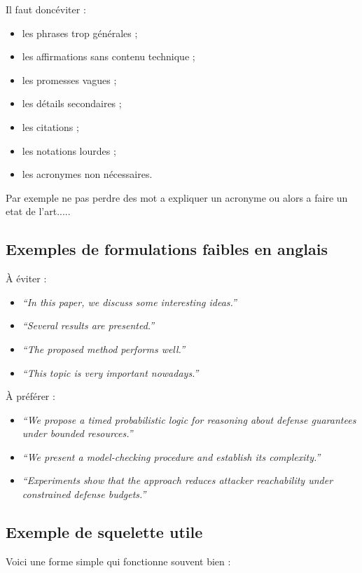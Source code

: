 \documentclass[11pt,a4paper]{article}
\theoremstyle{definition}
\begin{document}
Il faut doncéviter :
\begin{itemize}
    \item les phrases trop générales ;
    \item les affirmations sans contenu technique ;
    \item les promesses vagues ;
    \item les détails secondaires ;
    \item les citations ;
    \item les notations lourdes ;
    \item les acronymes non nécessaires.
\end{itemize}
Par exemple ne pas perdre des mot a expliquer un acronyme ou alors a faire un etat de l'art.....

\subsection*{Exemples de formulations faibles en anglais}

À éviter :
\begin{itemize}
    \item \textit{``In this paper, we discuss some interesting ideas.''}
    \item \textit{``Several results are presented.''}
    \item \textit{``The proposed method performs well.''}
    \item \textit{``This topic is very important nowadays.''}
\end{itemize}

À préférer :
\begin{itemize}
    \item \textit{``We propose a timed probabilistic logic for reasoning about defense guarantees under bounded resources.''}
    \item \textit{``We present a model-checking procedure and establish its complexity.''}
    \item \textit{``Experiments show that the approach reduces attacker reachability under constrained defense budgets.''}
\end{itemize}



\subsection*{Exemple de squelette utile}

Voici une forme simple qui fonctionne souvent bien :
\end{document}
